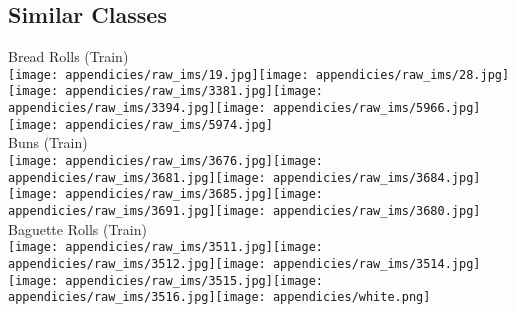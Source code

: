 \documentclass[letterpaper, 11pt]{IEEEtran}
\begin{document}
\clearpage
\subsection{Similar Classes}\label{append_similar}
\begin{figure*}[!ht]    
    \centering
    \fontsize{8}{8}\selectfont
     Bread Rolls (Train)\\ \vspace{0.2em}
\texttt{[image: appendicies/raw\_ims/19.jpg]}\texttt{[image: appendicies/raw\_ims/28.jpg]}\texttt{[image: appendicies/raw\_ims/3381.jpg]}\texttt{[image: appendicies/raw\_ims/3394.jpg]}\texttt{[image: appendicies/raw\_ims/5966.jpg]}\texttt{[image: appendicies/raw\_ims/5974.jpg]}\\ \vspace{0.2em}
 Buns (Train)\\
 \vspace{0.2em}
\texttt{[image: appendicies/raw\_ims/3676.jpg]}\texttt{[image: appendicies/raw\_ims/3681.jpg]}\texttt{[image: appendicies/raw\_ims/3684.jpg]}\texttt{[image: appendicies/raw\_ims/3685.jpg]}\texttt{[image: appendicies/raw\_ims/3691.jpg]}\texttt{[image: appendicies/raw\_ims/3680.jpg]}\\ \vspace{0.2em}
 Baguette Rolls (Train)\\ \vspace{0.2em}
\texttt{[image: appendicies/raw\_ims/3511.jpg]}\texttt{[image: appendicies/raw\_ims/3512.jpg]}\texttt{[image: appendicies/raw\_ims/3514.jpg]}\texttt{[image: appendicies/raw\_ims/3515.jpg]}\texttt{[image: appendicies/raw\_ims/3516.jpg]}\texttt{[image: appendicies/white.png]}\\  \vspace{0.2em}

\end{figure*}
\end{document}
